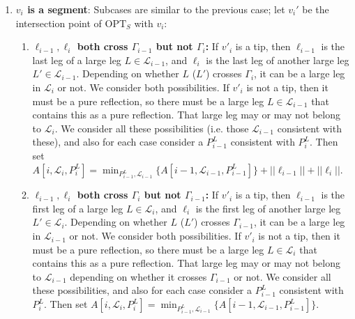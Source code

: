 \documentclass[pdflatex,sn-mathphys-num]{sn-jnl}
\theoremstyle{thmstyleone}
\newcommand{\OPT}{{\text{OPT}}}
\begin{document}
\begin{enumerate}
\begin{enumerate}
        \item \textbf{Exactly one of $\ell_{i-1},\ell_i$ crosses $\Gamma_{i-1}$ and one crosses $\Gamma_i$:}
        Say $\ell_{i-1}$ crosses $\Gamma_{i-1}$, and $\ell_i$ crosses $\Gamma_i$. So $\ell_{i-1}$ will be the last leg of a large leg $L\in\mathcal L_{i-1}$, and $\ell_i$ will be the first leg of a large leg $L'\in\mathcal L_i$. If $L$ does not cross $\Gamma_i$, then $L$ is not in $\mathcal L_i$ at all. Similarly, if $L'$ doesn't cross $\Gamma_{i-1}$, then $L'$ isn't a large leg in $\mathcal L_{i-1}$. We consider both possiblities (i.e. consider sets $\mathcal L_{i-1}$ that are consistent with one of these cases).
        $A[i,\mathcal L_i,P^L_i]=\min_{P^L_{i-1},\mathcal L_{i-1}} \{A[i-1,\mathcal L_{i-1},P^L_{i-1}]\}+||\ell_{i-1}||$.
    \end{enumerate}
    \item \textbf{$v_i$ is a segment}: Subcases are similar to the previous case; let $ v_i' $ be the intersection point of $ \OPT_S $ with $ v_i $:
    \begin{enumerate}
        \item \textbf{$\ell_{i-1},\ell_i$ both cross $\Gamma_{i-1}$ but not $\Gamma_i$:}
        If $v'_i$ is a tip, then $\ell_{i-1}$ is the last leg of a large leg $L\in\mathcal L_{i-1}$, and $\ell_i$ 
        is the last leg of another large leg $L'\in\mathcal L_{i-1}$. Depending on whether $L$ ($L'$) crosses $\Gamma_i$, it can be a large leg in $\mathcal L_i$ or not. We consider both possibilities.
        If $v'_i$ is not a tip, then it must be a pure reflection, so there must be a large leg $L\in\mathcal L_{i-1}$ that contains this as a pure reflection. That large leg may or may not belong to $\mathcal L_i$. We consider all these possibilities (i.e. those $\mathcal L_{i-1}$ consistent with these), and also for each case consider a $P^L_{i-1}$ consistent with $P^L_i$. Then set         
        $A[i,\mathcal L_i,P^L_i]=\min_{P^L_{i-1},\mathcal L_{i-1}} \{A[i-1,\mathcal L_{i-1},P^L_{i-1}]\}+||\ell_{i-1}||
        +||\ell_i||$.
        \item \textbf{$\ell_{i-1},\ell_i$ both cross $\Gamma_i$ but not $\Gamma_{i-1}$:}
        If $v'_i$ is a tip, then $\ell_{i-1}$ is the first leg of a large leg $L\in\mathcal L_{i}$, and $ \ell_i$ 
        is the first leg of another large leg $L'\in\mathcal L_{i}$. Depending on whether $L$ ($L'$) crosses $\Gamma_{i-1}$, it can be a large leg in $\mathcal L_{i-1}$ or not. We consider both possibilities.
        If $v'_i$ is not a tip, then it must be a pure reflection, so there must be a large leg $L\in\mathcal L_{i}$ that contains this as a pure reflection. That large leg may or may not belong to $\mathcal L_{i-1}$ depending on whether it crosses $\Gamma_{i-1}$ or not. We consider all these possibilities, and also for each case consider a $P^L_{i-1}$ consistent with $P^L_i$. Then set         
        $A[i,\mathcal L_i,P^L_i]=\min_{P^L_{i-1},\mathcal L_{i-1}} \{A[i-1,\mathcal L_{i-1},P^L_{i-1}]\}$.
        

\end{enumerate}
\end{enumerate}
\end{document}
